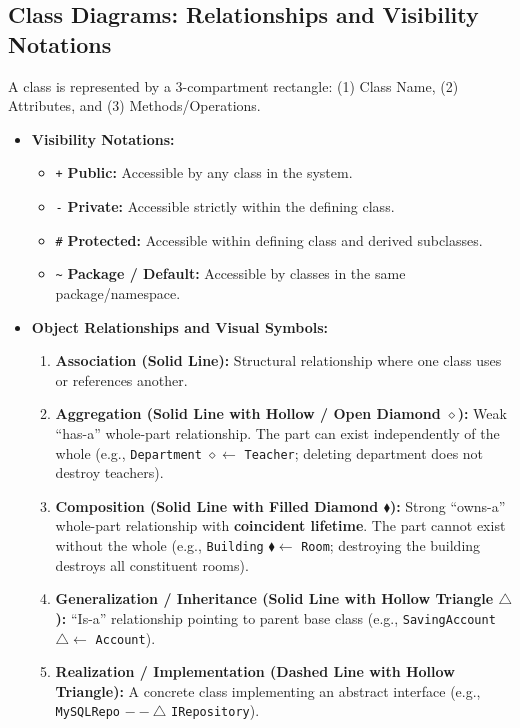 \subsection{Class Diagrams: Relationships and Visibility Notations}
A class is represented by a 3-compartment rectangle: (1) Class Name, (2) Attributes, and (3) Methods/Operations.
\begin{itemize}
    \item \textbf{Visibility Notations:}
    \begin{itemize}
        \item \texttt{+} \textbf{Public:} Accessible by any class in the system.
        \item \texttt{-} \textbf{Private:} Accessible strictly within the defining class.
        \item \texttt{\#} \textbf{Protected:} Accessible within defining class and derived subclasses.
        \item \texttt{\~{}} \textbf{Package / Default:} Accessible by classes in the same package/namespace.
    \end{itemize}
    \item \textbf{Object Relationships and Visual Symbols:}
    \begin{enumerate}
        \item \textbf{Association (Solid Line):} Structural relationship where one class uses or references another.
        \item \textbf{Aggregation (Solid Line with Hollow / Open Diamond $\diamond$):} Weak ``has-a'' whole-part relationship. The part can exist independently of the whole (e.g., \texttt{Department} $\diamond\longleftarrow$ \texttt{Teacher}; deleting department does not destroy teachers).
        \item \textbf{Composition (Solid Line with Filled Diamond $\blacklozenge$):} Strong ``owns-a'' whole-part relationship with \textbf{coincident lifetime}. The part cannot exist without the whole (e.g., \texttt{Building} $\blacklozenge\longleftarrow$ \texttt{Room}; destroying the building destroys all constituent rooms).
        \item \textbf{Generalization / Inheritance (Solid Line with Hollow Triangle $\triangle$):} ``Is-a'' relationship pointing to parent base class (e.g., \texttt{SavingAccount} $\triangle\longleftarrow$ \texttt{Account}).
        \item \textbf{Realization / Implementation (Dashed Line with Hollow Triangle):} A concrete class implementing an abstract interface (e.g., \texttt{MySQLRepo} $--\triangle$ \texttt{IRepository}).
    \end{enumerate}
\end{itemize}

